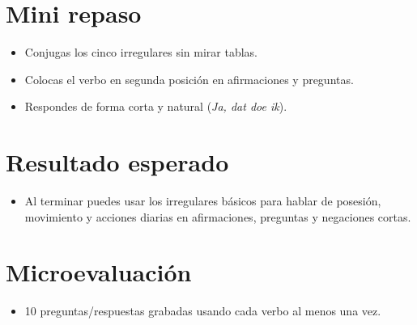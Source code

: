 \section{Mini repaso}
\begin{itemize}[leftmargin=*]
	\item Conjugas los cinco irregulares sin mirar tablas.
	\item Colocas el verbo en segunda posición en afirmaciones y preguntas.
	\item Respondes de forma corta y natural (\textit{Ja, dat doe ik}).
\end{itemize}

\section{Resultado esperado}
\begin{itemize}[leftmargin=*]
	\item Al terminar puedes usar los irregulares básicos para hablar de posesión, movimiento y acciones diarias en afirmaciones, preguntas y negaciones cortas.
\end{itemize}

\section{Microevaluación}
\begin{itemize}[leftmargin=*]
	\item 10 preguntas/respuestas grabadas usando cada verbo al menos una vez.
\end{itemize}
